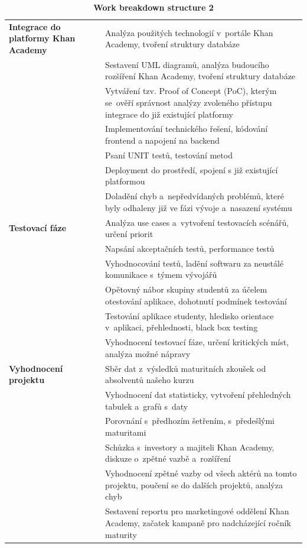 \documentclass[12pt, a4paper]{report}
\begin{document}
\begin{table}[htbp]
\caption{\label{tab:wbs2}
\textbf{Work breakdown structure 2}}
\centering
\scriptsize
\begin{tabularx}{\textwidth}{|X|X|}
\hline
\textbf{Integrace do platformy Khan Academy} & Analýza použitých technologií v portále Khan Academy, tvoření struktury databáze\\
 & Sestavení UML diagramů, analýza budoucího rozšíření Khan Academy, tvoření struktury databáze\\
 & Vytváření tzv. Proof of Concept (PoC), kterým se ověří správnost analýzy zvoleného přístupu integrace do již existující platformy\\
 & Implementování technického řešení, kódování frontend a napojení na backend\\
 & Psaní UNIT testů, testování metod\\
 & Deployment do prostředí, spojení s již existující platformou\\
 & Doladění chyb a nepředvídaných problémů, které byly odhaleny již ve fázi vývoje a nasazení systému\\
\hline
\textbf{Testovací fáze} & Analýza use cases a vytvoření testovacích scénářů, určení priorit\\
 & Napsání akceptačních testů, performance testů\\
 & Vyhodnocování testů, ladění softwaru za neustálé komunikace s týmem vývojářů\\
 & Opětovný nábor skupiny studentů za účelem otestování aplikace, dohotnutí podmínek testování\\
 & Testování aplikace studenty, hledisko orientace v aplikaci, přehlednosti, black box testing\\
 & Vyhodnocení testovací fáze, určení kritických míst, analýza možné nápravy\\
\hline
\textbf{Vyhodnocení projektu} & Sběr dat z výsledků maturitních zkoušek od absolventů našeho kurzu\\
 & Vyhodnocení dat statisticky, vytvoření přehledných tabulek a grafů s daty\\
 & Porovnání s předhozím šetřením, s předešlými maturitami\\
 & Schůzka s investory a majiteli Khan Academy, diskuze o zpětné vazbě a rozšíření\\
 & Vyhodnocení zpětné vazby od všech aktérů na tomto projektu, poučení se do dalších projektů, analýza chyb\\
 & Sestavení reportu pro marketingové oddělení Khan Academy, začatek kampaně pro nadcházející ročník maturity\\
\hline
\end{tabularx}
\end{table}
\end{document}
